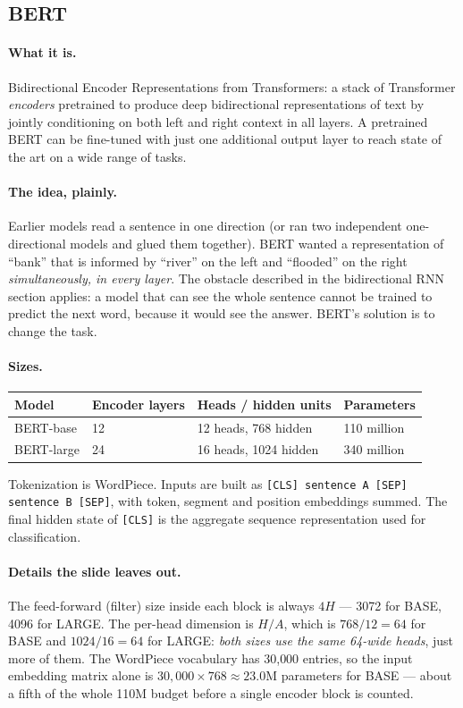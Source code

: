 \documentclass[11pt,a4paper]{article}
\begin{document}
\subsection{BERT}
\label{sec:bert}

\paragraph{What it is.} Bidirectional Encoder Representations from Transformers: a stack of
Transformer \emph{encoders} pretrained to produce deep bidirectional representations of text
by jointly conditioning on both left and right context in all layers. A pretrained BERT can
be fine-tuned with just one additional output layer to reach state of the art on a wide
range of tasks.

\paragraph{The idea, plainly.} Earlier models read a sentence in one direction (or ran two
independent one-directional models and glued them together). BERT wanted a representation of
``bank'' that is informed by ``river'' on the left and ``flooded'' on the right
\emph{simultaneously, in every layer}. The obstacle described in the bidirectional RNN
section applies: a model that can see the whole sentence cannot be trained to predict the
next word, because it would see the answer. BERT's solution is to change the task.

\paragraph{Sizes.}
\begin{center}
\begin{tabularx}{\textwidth}{lYYY}
\textbf{Model} & \textbf{Encoder layers} & \textbf{Heads / hidden units} & \textbf{Parameters} \\
\hline
BERT-base & 12 & 12 heads, 768 hidden & 110 million \\
BERT-large & 24 & 16 heads, 1024 hidden & 340 million \\
\end{tabularx}
\end{center}
Tokenization is WordPiece. Inputs are built as
\texttt{[CLS] sentence A [SEP] sentence B [SEP]}, with token, segment and position
embeddings summed. The final hidden state of \texttt{[CLS]} is the aggregate sequence
representation used for classification.

\paragraph{Details the slide leaves out.} The feed-forward (filter) size inside each block is
always $4H$ --- 3072 for BASE, 4096 for LARGE. The per-head dimension is $H/A$, which is
$768/12 = 64$ for BASE and $1024/16 = 64$ for LARGE: \emph{both sizes use the same 64-wide
heads}, just more of them. The WordPiece vocabulary has 30{,}000 entries, so the input
embedding matrix alone is $30{,}000 \times 768 \approx 23.0$M parameters for BASE --- about a
fifth of the whole 110M budget before a single encoder block is counted.
\end{document}
